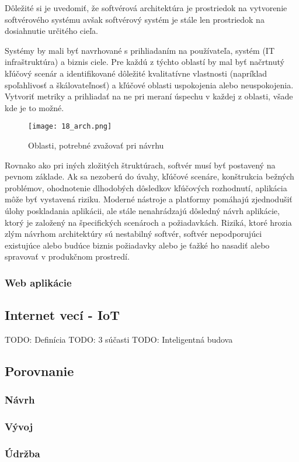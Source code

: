 Dôležité si je uvedomiť, že softvérová architektúra je prostriedok na vytvorenie softvérového systému avšak softvérový systém je stále len prostriedok na dosiahnutie určitého cieľa. 

\indent Systémy by mali byť navrhované s prihliadaním na používateľa, systém (IT infraštruktúra) a biznis ciele. Pre každú z týchto oblastí by mal byť načrtnutý kľúčový scenár a identifikované dôležité kvalitatívne vlastnosti (napríklad spoľahlivosť a škálovateľnosť) a kľúčové oblasti uspokojenia alebo neuspokojenia. Vytvoriť metriky a prihliadať na ne pri meraní úspechu v každej z oblasti, všade kde je to možné.
\cite{IOT02}

\begin{figure}[h]
\centering
\texttt{[image: 18\_arch.png]}
\caption{Oblasti, potrebné zvažovať pri návrhu\cite{IOT02}}
\label{18_arch}
\end{figure}


\indent Rovnako ako pri iných zložitých štruktúrach, softvér musí byť postavený na pevnom základe. Ak sa nezoberú do úvahy, kľúčové scenáre, konštrukcia bežných problémov, ohodnotenie dlhodobých dôsledkov kľúčových rozhodnutí, aplikácia môže byť vystavená riziku. Moderné nástroje a platformy pomáhajú zjednodušiť úlohy poskladania aplikácii, ale stále nenahrádzajú dôsledný návrh aplikácie, ktorý je založený na špecifických scenároch a požiadavkách. Riziká, ktoré hrozia zlým návrhom architektúry sú nestabilný softvér, softvér nepodporujúci existujúce alebo budúce biznis požiadavky alebo je ťažké ho nasadiť alebo spravovať v produkčnom prostredí.\\


\subsubsection{Web aplikácie}

\subsection{Internet vecí - IoT}
TODO: Definícia
TODO: 3 súčasti
TODO: Inteligentná budova
\subsection{Porovnanie}
\subsubsection{Návrh}
\subsubsection{Vývoj}
\subsubsection{Údržba}
